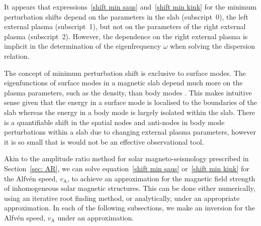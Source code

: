\documentclass[namedreferences]{solarphysics}
\numberwithin{equation}{section}
\begin{document}
\begin{article}
It appears that expressions~\eqref{shift min saus} and~\eqref{shift min kink} for the minimum perturbation shifts depend on the parameters in the slab (subscript~0), the left external plasma (subscript~1), but not on the parameters of the right external plasma (subscript~2). However, the dependence on the right external plasma is implicit in the determination of the eigenfrequency $\omega$ when solving the dispersion relation.

The concept of minimum perturbation shift is exclusive to surface modes. The eigenfunctions of surface modes in a magnetic slab depend much more on the plasma parameters, such as the density, than body modes \citep{all_etal17}. This makes intuitive sense given that the energy in a surface mode is localised to the boundaries of the slab whereas the energy in a body mode is largely isolated within the slab. There is a quantifiable shift in the spatial nodes and anti-nodes in body mode perturbations within a slab due to changing external plasma parameters, however it is so small that is would not be an effective observational tool.

Akin to the amplitude ratio method for solar magneto-seismology prescribed in Section~\ref{sec: AR}, we can solve equation~\eqref{shift min saus} or~\eqref{shift min kink} for the Alfv\'{e}n speed, $v_\textrm{A}$, to achieve an approximation for the magnetic field strength of inhomogeneous solar magnetic structures. This can be done either numerically, using an iterative root finding method, or analytically, under an appropriate approximation. In each of the following subsections, we make an inversion for the Alfv\'{e}n speed, $v_\textrm{A}$ under an approximation.



\end{article}
\end{document}
